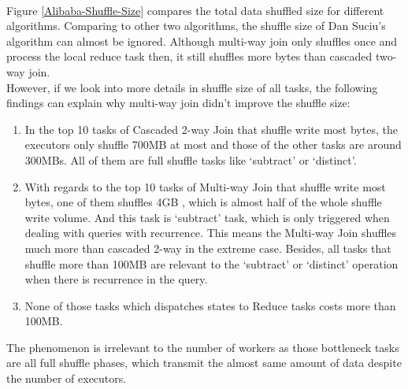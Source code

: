 \\Figure \ref{Alibaba-Shuffle-Size} compares the total data shuffled size for different algorithms. Comparing to other two algorithms, the shuffle size of Dan Suciu's algorithm can almost be ignored. Although multi-way join only shuffles once and process the local reduce task then, it still shuffles more bytes than cascaded two-way join.
\\However, if we look into more details in shuffle size of all tasks, the following findings can explain why multi-way join didn't improve the shuffle size:
\begin{enumerate}
    \item In the top 10 tasks of Cascaded 2-way Join that shuffle write most bytes, the executors only shuffle 700MB at most and those of the other tasks are around 300MBs. All of them are full shuffle tasks like `subtract' or `distinct'.
    \item With regards to the top 10 tasks of Multi-way Join that shuffle write most bytes, one of them shuffles 4GB , which is almost half of the whole shuffle write volume. And this task is `subtract' task, which is only triggered when dealing with queries with recurrence. This means the Multi-way Join shuffles much more than cascaded 2-way in the extreme case. Besides, all tasks that shuffle more than 100MB are relevant to the `subtract' or `distinct' operation when there is recurrence in the query.
    \item None of those tasks which dispatches states to Reduce tasks costs more than 100MB.
\end{enumerate}
The phenomenon is irrelevant to the number of workers as those bottleneck tasks are all full shuffle phases, which transmit the almost same amount of data despite the number of executors.

